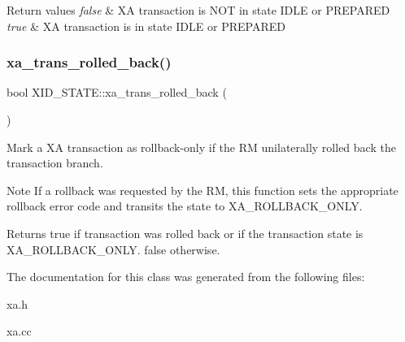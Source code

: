 \begin{DoxyRetVals}{Return values}
{\em false} & XA transaction is N\+OT in state I\+D\+LE or P\+R\+E\+P\+A\+R\+ED \\
\hline
{\em true} & XA transaction is in state I\+D\+LE or P\+R\+E\+P\+A\+R\+ED \\
\hline
\end{DoxyRetVals}
\mbox{\label{classXID__STATE_a5ea0c74d50c158009744d26e9631fb40}} 
\subsubsection{\texorpdfstring{xa\+\_\+trans\+\_\+rolled\+\_\+back()}{xa\_trans\_rolled\_back()}}
{\footnotesize\ttfamily bool X\+I\+D\+\_\+\+S\+T\+A\+T\+E\+::xa\+\_\+trans\+\_\+rolled\+\_\+back (\begin{DoxyParamCaption}{ }\end{DoxyParamCaption})}

Mark a XA transaction as rollback-\/only if the RM unilaterally rolled back the transaction branch.

\begin{DoxyNote}{Note}
If a rollback was requested by the RM, this function sets the appropriate rollback error code and transits the state to X\+A\+\_\+\+R\+O\+L\+L\+B\+A\+C\+K\+\_\+\+O\+N\+LY.
\end{DoxyNote}
\begin{DoxyReturn}{Returns}
true if transaction was rolled back or if the transaction state is X\+A\+\_\+\+R\+O\+L\+L\+B\+A\+C\+K\+\_\+\+O\+N\+LY. false otherwise. 
\end{DoxyReturn}


The documentation for this class was generated from the following files\+:\begin{DoxyCompactItemize}
\item 
xa.\+h\item 
xa.\+cc\end{DoxyCompactItemize}

